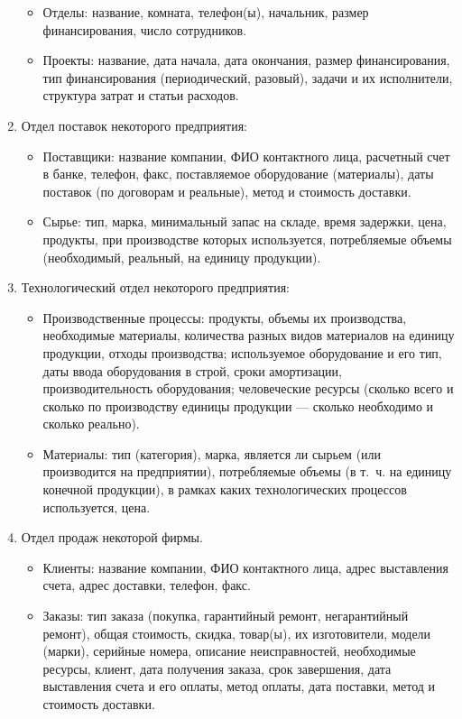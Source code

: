 \documentclass[12pt, openany, twoside]{book} %
\begin{document}
\begin{enumerate}
\begin{itemize}
\item Отделы: название, комната, телефон(ы), начальник, размер финансирования, число сотрудников.
\item Проекты: название, дата начала, дата окончания, размер финансирования, тип финансирования (периодический, разовый), задачи и их исполнители, структура затрат и статьи расходов.
\end{itemize}
\item Отдел поставок некоторого предприятия:
\begin{itemize}
\item Поставщики: название компании, ФИО контактного лица, расчетный счет в банке, телефон, факс, поставляемое оборудование (материалы), даты поставок (по договорам и реальные), метод и стоимость доставки.
\item Сырье: тип, марка, минимальный запас на складе, время задержки, цена, продукты, при производстве которых используется, потребляемые объемы (необходимый, реальный, на единицу продукции).
\end{itemize}
\item Технологический отдел некоторого предприятия:
\begin{itemize}
\item Производственные процессы: продукты, объемы их производства, необходимые материалы, количества разных видов материалов на единицу продукции, отходы производства; используемое оборудование и его тип, даты ввода оборудования в строй, сроки амортизации, производительность оборудования; человеческие ресурсы (сколько всего и сколько по производству единицы продукции --- сколько необходимо и сколько реально).
\item Материалы: тип (категория), марка, является ли сырьем (или производится на предприятии), потребляемые объемы (в т.~ч. на единицу конечной продукции), в рамках каких технологических процессов используется, цена.
\end{itemize}
\item Отдел продаж некоторой фирмы.
\begin{itemize}
\item Клиенты: название компании, ФИО контактного лица, адрес выставления счета, адрес доставки, телефон, факс.
\item Заказы: тип заказа (покупка, гарантийный ремонт, негарантийный ремонт), общая стоимость, скидка, товар(ы), их изготовители, модели (марки), серийные номера, описание неисправностей, необходимые ресурсы, клиент, дата получения заказа, срок завершения, дата выставления счета и его оплаты, метод оплаты, дата поставки, метод и стоимость доставки.

\end{itemize}
\end{enumerate}
\end{document}
